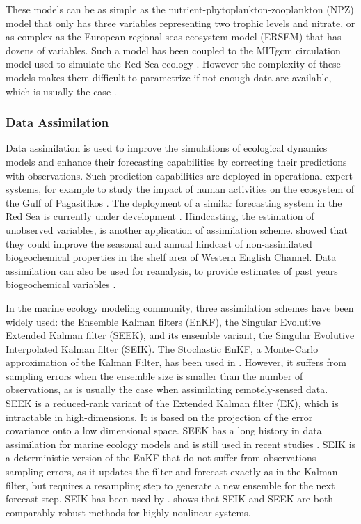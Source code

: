 These models can be as simple as the nutrient-phytoplankton-zooplankton (NPZ) model that only has three variables representing two trophic levels and nitrate, or as complex as the European regional seas ecosystem model (ERSEM) that has dozens of variables. Such a model has been coupled to the MITgcm circulation model used to simulate the Red Sea ecology \citep{Triantafyllou2014}. However the complexity of these models makes them difficult to parametrize if not enough data are available, which is usually the case \citep{Anderson2005}.

\subsubsection{Data Assimilation}

Data assimilation is used to improve the simulations of ecological dynamics models and enhance their forecasting capabilities by correcting their predictions with observations. Such prediction capabilities are deployed in operational expert systems, for example to study the impact of human activities on the ecosystem of the Gulf of Pagasitikos \citep{Korres2012}. The deployment of a similar forecasting system in the Red Sea is currently under development \citep{Triantafyllou2014}. Hindcasting, the estimation of unobserved variables, is another application of assimilation scheme. \citet{Ciavatta2011}  showed that they could improve the seasonal and annual hindcast of non-assimilated biogeochemical properties in the shelf area of Western English Channel. Data assimilation can also be used for reanalysis, to provide estimates of past years biogeochemical variables \citep{Fontana2013}. 

In the marine ecology modeling community, three assimilation schemes have been widely used: the Ensemble Kalman filters (EnKF), the Singular Evolutive Extended Kalman filter (SEEK), and its ensemble variant, the Singular Evolutive Interpolated Kalman filter (SEIK). The Stochastic EnKF, a Monte-Carlo approximation of the Kalman Filter, has been used in \citet{Ciavatta2011, Ciavatta2014}. However, it suffers from sampling errors when the ensemble size is smaller than the number of observations, as is usually the case when assimilating remotely-sensed data. SEEK is a reduced-rank variant of the Extended Kalman filter (EK), which is intractable in high-dimensions. It is based  on the projection of the error covariance onto a low dimensional space. SEEK has a long history in data assimilation for marine ecology models and is still used in recent studies \citep{Fontana2013, Korres2012, Butenschon2012}. SEIK is a deterministic version of the EnKF that do not suffer from observations sampling errors, as it updates the filter and forecast exactly as in the Kalman filter, but requires a resampling step to generate a new ensemble for the next forecast step. SEIK has been used by \citep{Triantafyllou2012, Korres2012}. \citet{Korres2012} shows that SEIK and SEEK are both comparably robust methods for highly nonlinear systems.

